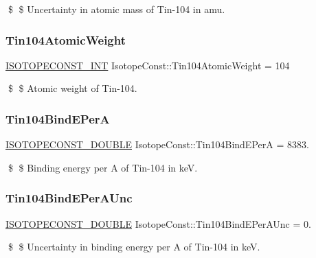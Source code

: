 \$ \$ Uncertainty in atomic mass of Tin-\/104 in amu. \mbox{\label{group___isotope_const-_tin-_sn104_ga1fed39e65506b3ec7b9484cc77fa6014}} 
\subsubsection{\texorpdfstring{Tin104\+Atomic\+Weight}{Tin104AtomicWeight}}
{\footnotesize\ttfamily \mbox{\hyperlink{group___isotope_const-_macros_ga5f18360b3e99483a35c32d789e62621c}{I\+S\+O\+T\+O\+P\+E\+C\+O\+N\+S\+T\+\_\+\+I\+NT}} Isotope\+Const\+::\+Tin104\+Atomic\+Weight = 104}

\$ \$ Atomic weight of Tin-\/104. \mbox{\label{group___isotope_const-_tin-_sn104_ga1870ba6153b46f61dc9bacf66ab38e27}} 
\subsubsection{\texorpdfstring{Tin104\+Bind\+E\+PerA}{Tin104BindEPerA}}
{\footnotesize\ttfamily \mbox{\hyperlink{group___isotope_const-_macros_ga8f45a7272ce02c0b4c65c44636ed719a}{I\+S\+O\+T\+O\+P\+E\+C\+O\+N\+S\+T\+\_\+\+D\+O\+U\+B\+LE}} Isotope\+Const\+::\+Tin104\+Bind\+E\+PerA = 8383.}

\$ \$ Binding energy per A of Tin-\/104 in keV. \mbox{\label{group___isotope_const-_tin-_sn104_ga77510a18823b17a58a1559fd4b41a153}} 
\subsubsection{\texorpdfstring{Tin104\+Bind\+E\+Per\+A\+Unc}{Tin104BindEPerAUnc}}
{\footnotesize\ttfamily \mbox{\hyperlink{group___isotope_const-_macros_ga8f45a7272ce02c0b4c65c44636ed719a}{I\+S\+O\+T\+O\+P\+E\+C\+O\+N\+S\+T\+\_\+\+D\+O\+U\+B\+LE}} Isotope\+Const\+::\+Tin104\+Bind\+E\+Per\+A\+Unc = 0.}

\$ \$ Uncertainty in binding energy per A of Tin-\/104 in keV. \mbox{\label{group___isotope_const-_tin-_sn104_ga2b7e2cf8f8063367a2756f05c83efe4c}} 

